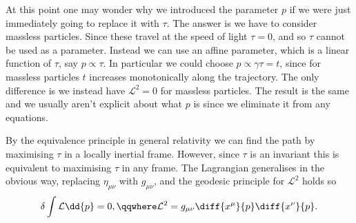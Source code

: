 \documentclass[fleqn]{NotesClass}
\newcommand*{\lagrangian}{\mathcal{L}}
\begin{document}
    At this point one may wonder why we introduced the parameter \(p\) if we were just immediately going to replace it with \(\tau\).
    The answer is we have to consider massless particles.
    Since these travel at the speed of light \(\tau = 0\), and so \(\tau\) cannot be used as a parameter.
    Instead we can use an affine parameter, which is a linear function of \(\tau\), say \(p \propto \tau\).
    In particular we could choose \(p \propto \gamma \tau = t\), since for massless particles \(t\) increases monotonically along the trajectory.
    The only difference is we instead have \(\lagrangian^2 = 0\) for massless particles.
    The result is the same and we usually aren't explicit about what \(p\) is since we eliminate it from any equations.
    
    By the equivalence principle in general relativity we can find the path by maximising \(\tau\) in a locally inertial frame.
    However, since \(\tau\) is an invariant this is equivalent to maximising \(\tau\) in any frame.
    The Lagrangian generalises in the obvious way, replacing \(\eta_{\mu\nu}\) with \(g_{\mu\nu}\), and the geodesic principle for \(\lagrangian^2\) holds so
    \begin{equation}
        \delta \int \lagrangian \dd{p} = 0, \qqwhere \lagrangian^2 = g_{\mu\nu} \diff{x^\mu}{p} \diff{x^\nu}{p}.
    \end{equation}
    
\end{document}
